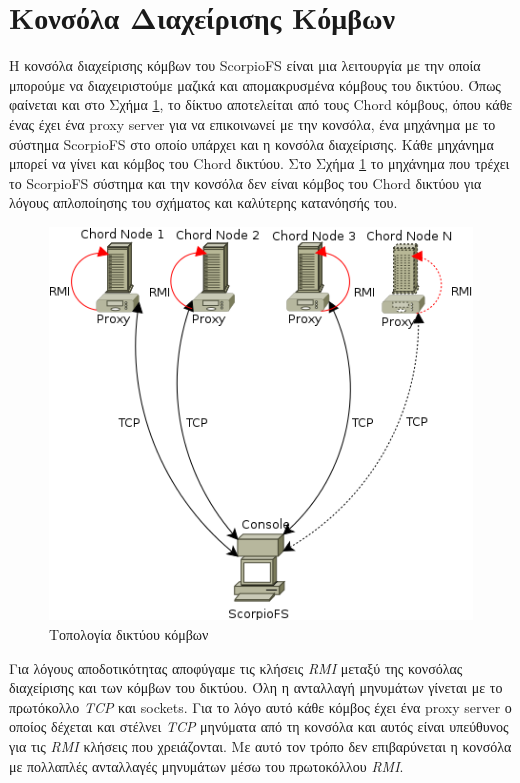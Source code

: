 \documentclass[a4paper]{article}
\begin{document}
\section{Κονσόλα Διαχείρισης Κόμβων}
Η κονσόλα διαχείρισης κόμβων του ScorpioFS είναι μια λειτουργία με την οποία
μπορούμε να διαχειριστούμε μαζικά και απομακρυσμένα κόμβους του δικτύου. Όπως
φαίνεται και στο Σχήμα \ref{fig:topology}, το δίκτυο αποτελείται από τους Chord
κόμβους, όπου κάθε ένας έχει ένα proxy server για να επικοινωνεί με την κονσόλα,
ένα μηχάνημα με το σύστημα ScorpioFS στο οποίο υπάρχει και η κονσόλα
διαχείρισης. Κάθε μηχάνημα μπορεί να γίνει και κόμβος του Chord δικτύου. Στο
Σχήμα \ref{fig:topology} το μηχάνημα που τρέχει το ScorpioFS σύστημα και την
κονσόλα δεν είναι κόμβος του Chord δικτύου για λόγους απλοποίησης του σχήματος
και καλύτερης κατανόησής του.

\begin{figure}[tbh]
\centering
\includegraphics[scale=0.75]{images/scorpio_console.png}
\caption{Τοπολογία δικτύου κόμβων}
\label{fig:topology}
\end{figure}

Για λόγους αποδοτικότητας αποφύγαμε τις κλήσεις \emph{RMI} μεταξύ της κονσόλας
διαχείρισης και των κόμβων του δικτύου. Όλη η ανταλλαγή μηνυμάτων γίνεται με το
πρωτόκολλο \emph{TCP} και sockets. Για το λόγο αυτό κάθε κόμβος έχει ένα proxy
server ο οποίος δέχεται και στέλνει \emph{TCP} μηνύματα από τη κονσόλα και αυτός 
είναι υπεύθυνος για τις \emph{RMI} κλήσεις που χρειάζονται. Με αυτό τον τρόπο δεν
επιβαρύνεται η κονσόλα με πολλαπλές ανταλλαγές μηνυμάτων μέσω του πρωτοκόλλου
\emph{RMI}.
\end{document}
